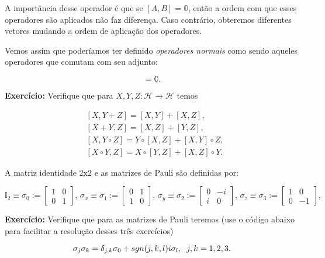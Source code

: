 \documentclass[11pt]{article}
\begin{document}
A importância desse operador é que se \([A,B]=\mathbb{0}\), então a
ordem com que esses operadores são aplicados não faz diferença. Caso
contrário, obteremos diferentes vetores mudando a ordem de aplicação dos
operadores.

Vemos assim que poderíamos ter definido \emph{operadores normais} como
sendo aqueles operadores que comutam com seu adjunto:

\begin{equation}
[A,A^{\dagger}] = \mathbb{0}.
\end{equation}

\textbf{Exercício:} Verifique que para
\(X,Y,Z:\mathcal{H}\rightarrow\mathcal{H}\) temos

\begin{align}
& [X,Y+Z] = [X,Y]+[X,Z], \\
& [X+Y,Z] = [X,Z]+[Y,Z], \\
& [X,Y\circ Z] = Y\circ[X,Z]+[X,Y]\circ Z, \\
& [X\circ Y,Z] = X\circ[Y,Z] + [X,Z]\circ Y.
\end{align}

A matriz identidade \(2\mathrm{x}2\) e as matrizes de Pauli são
definidas por:

\begin{equation}
\mathbb{I}_{2} \equiv \sigma_{0} := \begin{bmatrix} 1&0\\0&1 \end{bmatrix}\text{, }
\sigma_{x} \equiv \sigma_{1} := \begin{bmatrix} 0&1\\1&0 \end{bmatrix}\text{, }
\sigma_{y} \equiv \sigma_{2} := \begin{bmatrix} 0&-i\\i&0 \end{bmatrix}\text{, }
\sigma_{z} \equiv \sigma_{3} := \begin{bmatrix} 1&0\\0&-1 \end{bmatrix}\text{, }
\end{equation}

\textbf{Exercício:} Verifique que para as matrizes de Pauli teremos (use
o código abaixo para facilitar a resolução desses três exercícios)

\begin{equation}
\sigma_{j}\sigma_{k}=\delta_{j,k}\sigma_{0}+sgn(j,k,l)i\sigma_{l},  \hspace{0.2cm}  j,k=1,2,3.
\end{equation}
\end{document}
